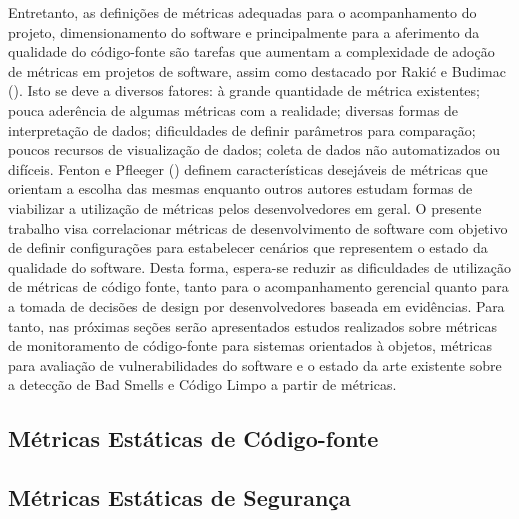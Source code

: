 Entretanto, as definições de métricas adequadas para o acompanhamento do projeto, dimensionamento do software e principalmente para a aferimento da qualidade do código-fonte são tarefas que aumentam a complexidade de adoção de métricas em projetos de software, assim como destacado por Rakić e Budimac (\citeyear{rakic2011budimac}). Isto se deve a diversos fatores: à grande quantidade de métrica existentes; pouca aderência de algumas métricas com a realidade; diversas formas de interpretação de dados; dificuldades de definir parâmetros para comparação; poucos recursos de visualização de dados; coleta de dados não automatizados ou difíceis. Fenton e Pfleeger (\citeyear{fenton1998}) definem características desejáveis de métricas que orientam a escolha das mesmas enquanto outros autores \cite{meirelles2013metrics}\cite{almeida2010} estudam formas de viabilizar a utilização de métricas pelos desenvolvedores em geral. O presente trabalho visa correlacionar métricas de desenvolvimento de software com objetivo de definir configurações para estabelecer cenários que representem o estado da qualidade do software. Desta forma, espera-se reduzir as dificuldades de utilização de métricas de código fonte, tanto para o acompanhamento gerencial quanto para a tomada de decisões de design por desenvolvedores baseada em evidências. Para tanto, nas próximas seções serão apresentados estudos realizados sobre métricas de monitoramento de código-fonte para sistemas orientados à objetos, métricas para avaliação de vulnerabilidades do software e o estado da arte existente sobre a detecção de Bad Smells e Código Limpo a partir de métricas.

%

\subsection{Métricas Estáticas de Código-fonte}

%

\subsection{Métricas Estáticas de Segurança}

%  

%




